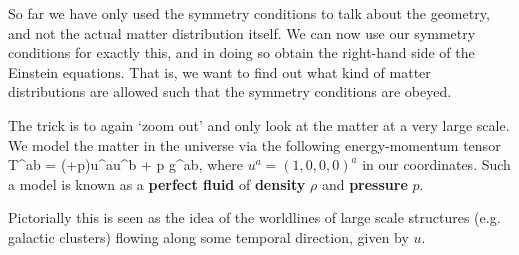 So far we have only used the symmetry conditions to talk about the geometry, and not the actual matter distribution itself. We can now use our symmetry conditions for exactly this, and in doing so obtain the right-hand side of the Einstein equations. That is, we want to find out what kind of matter distributions are allowed such that the symmetry conditions are obeyed.

The trick is to again `zoom out' and only look at the matter at a very large scale. We model the matter in the universe via the following energy-momentum tensor
\bse 
    T^{ab} = (\rho+p)u^au^b + p g^{ab},
\ese 
where $u^a = (1,0,0,0)^a$ in our coordinates. Such a model is known as a \textbf{perfect fluid} of \textbf{density} $\rho$ and \textbf{pressure} $p$.

Pictorially this is seen as the idea of the worldlines of large scale structures (e.g. galactic clusters) flowing along some temporal direction, given by $u$. 

